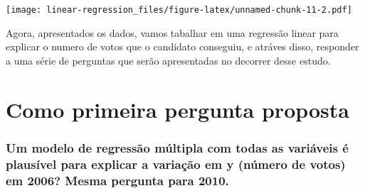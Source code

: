 \documentclass[]{article}
\newenvironment{Shaded}{\begin{snugshade}}{\end{snugshade}}
\newcommand{\KeywordTok}[1]{\textcolor[rgb]{0.13,0.29,0.53}{\textbf{#1}}}
\newcommand{\DataTypeTok}[1]{\textcolor[rgb]{0.13,0.29,0.53}{#1}}
\newcommand{\DecValTok}[1]{\textcolor[rgb]{0.00,0.00,0.81}{#1}}
\newcommand{\StringTok}[1]{\textcolor[rgb]{0.31,0.60,0.02}{#1}}
\newcommand{\OtherTok}[1]{\textcolor[rgb]{0.56,0.35,0.01}{#1}}
\newcommand{\OperatorTok}[1]{\textcolor[rgb]{0.81,0.36,0.00}{\textbf{#1}}}
\newcommand{\NormalTok}[1]{#1}
\begin{document}
\begin{Shaded}
\end{Shaded}

\texttt{[image: linear-regression\_files/figure-latex/unnamed-chunk-11-2.pdf]}

Agora, apresentados os dados, vamos tabalhar em uma regressão linear
para explicar o numero de votos que o candidato conseguiu, e atráves
disso, responder a uma série de perguntas que serão apresentadas no
decorrer desse estudo.

\section{Como primeira pergunta
proposta}\label{como-primeira-pergunta-proposta}

\subsubsection{Um modelo de regressão múltipla com todas as variáveis é
plausível para explicar a variação em y (número de votos) em 2006? Mesma
pergunta para
2010.}\label{um-modelo-de-regressao-multipla-com-todas-as-variaveis-e-plausivel-para-explicar-a-variacao-em-y-numero-de-votos-em-2006-mesma-pergunta-para-2010.}
\end{document}
